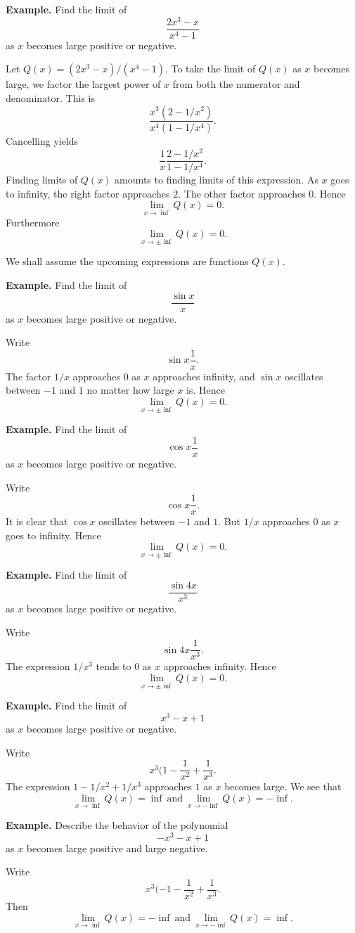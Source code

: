 \textbf{Example.} Find the limit of
\[\frac{2x^3 - x}{x^4 - 1}\]
as $x$ becomes large positive or negative.

Let $Q(x) = (2x^3 - x)/(x^4 - 1)$. To take the limit of $Q(x)$ as $x$ becomes large, we factor the largest power of $x$ from both the numerator and denominator. This is
\[\frac{x^3(2 - 1/x^2)}{x^4(1 - 1/x^4)}.\]
Cancelling yields
\[\frac{1}{x} \frac{2 - 1/x^2}{1 - 1/x^4}.\]
Finding limits of $Q(x)$ amounts to finding limits of this expression. As $x$ goes to infinity, the right factor approaches $2$. The other factor approaches $0$. Hence
\[\lim_{x\to\inf} Q(x) = 0.\]
Furthermore
\[\lim_{x\to\pm\inf} Q(x) = 0.\]

We shall assume the upcoming expressions are functions $Q(x)$.

\textbf{Example.} Find the limit of
\[\frac{\sin x}{x}\]
as $x$ becomes large positive or negative.

Write
\[\sin x \frac{1}{x}.\]
The factor $1/x$ approaches $0$ as $x$ approaches infinity, and $\sin x$ oscillates between $-1$ and $1$ no matter how large $x$ is. Hence
\[\lim_{x\to\pm\inf} Q(x) = 0.\]

\textbf{Example.} Find the limit of
\[\cos x \frac{1}{x}\]
as $x$ becomes large positive or negative.

Write
\[\cos x \frac{1}{x}.\]
It is clear that $\cos x$ oscillates between $-1$ and $1$. But $1/x$ approaches $0$ as $x$ goes to infinity. Hence
\[\lim_{x\to\pm\inf} Q(x) = 0.\]

\textbf{Example.} Find the limit of
\[\frac{\sin 4x}{x^3}\]
as $x$ becomes large positive or negative.

Write
\[\sin 4x \frac{1}{x^3}.\]
The expression $1/x^3$ tends to $0$ as $x$ approaches infinity. Hence
\[\lim_{x\to\pm\inf} Q(x) = 0.\]

\textbf{Example.} Find the limit of
\[x^3 - x + 1\]
as $x$ becomes large positive or negative.

Write
\[x^3(1 - \frac{1}{x^2} + \frac{1}{x^3}.\]
The expression $1 - 1/x^2 + 1/x^3$ approaches $1$ as $x$ becomes large. We see that
\[\lim_{x\to\inf} Q(x) = \inf\: \text{and}\: \lim_{x\to-\inf} Q(x) = -\inf.\]

\textbf{Example.} Describe the behavior of the polynomial
\[-x^3 - x + 1\]
as $x$ becomes large positive and large negative.

Write
\[x^3(-1 - \frac{1}{x^2} + \frac{1}{x^3}.\]
Then
\[\lim_{x\to\inf} Q(x) = -\inf\: \text{and}\: \lim_{x\to-\inf} Q(x) = \inf.\]

